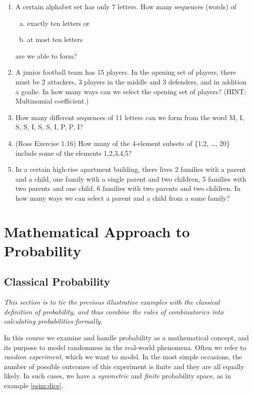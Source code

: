 \documentclass[12pt,a4paper,leqno]{report}
\theoremstyle{plain}
\theoremstyle{definition}
\begin{document}
\begin{enumerate}
\item A certain alphabet set has only 7 letters. How many sequences (words) of 
\begin{enumerate}[a)]
\item exactly ten letters or 
\item at most ten letters  
\end{enumerate}
are we able to form? 
\item A junior football team has 15 players. In the opening set of players, there must be 2 attackers, 3 players in the middle and 3 defenders, and in addition a goalie. In how many ways can we select the opening set of players? (HINT: Multinomial coefficient.)
\item How many different sequences of 11 letters can we form from the word M, I, S, S, I, S, S, I, P, P, I? 
\item (Ross Exercise 1.16) How many of the $4$-element subsets of \{1,2, \ldots, 20\} include some of the elements 1,2,3,4,5?
\item In a certain high-rise apartment building, there lives 2 families with a parent and a child, one family with a single parent and two children, 5 families with two parents and one child, 6 families with two parents and two children. In how many ways we can select a parent and a child from a same family?
\end{enumerate}

\bigskip


\chapter{Mathematical Approach to Probability}\label{math.prob}

\section{Classical Probability}\label{classprob}

\emph{This section is to tie the previous illustrative examples with the classical definition of probability, and thus combine the rules of combinatorics into calculating probabilities formally.}

In this course we examine and handle probability as a mathematical concept, and its purpose to model randomness in the real-world phenomena. Often we refer to \emph{random experiment}, which we want to model. In the most simple occasions, the number of possible outcomes of this experiment is finite and they are all equally likely. In such cases, we have a \emph{symmetric} and \emph{finite} probability space, as in example \ref{esim:dice}.
\end{document}
